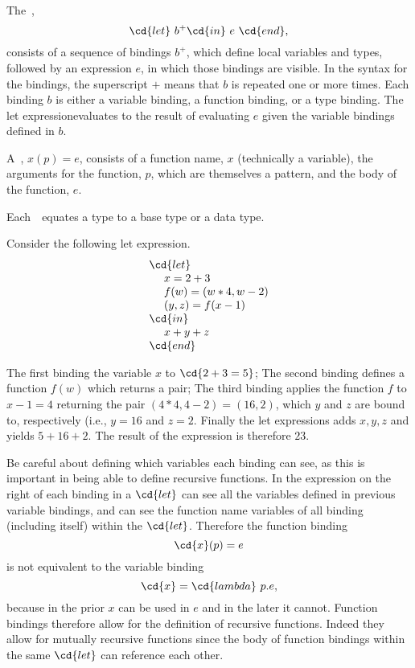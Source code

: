 \begin{gram}[Bindings]

The~, 
\[
\cd{let}~b^+\cd{in}~e~\cd{end},
\] 
%
consists of a sequence of bindings $b^+$, which define local variables
and types, followed by an expression $e$, in which those bindings are
visible.  In the syntax for the bindings, the superscript $+$ means
that $b$ is repeated one or more times.  Each binding $b$ is either a
variable binding, a function binding, or a type binding.
%
The let expressionevaluates to the result of evaluating $e$ given the
variable bindings defined in $b$.

A~, $x (p) = e$, consists of a function
name, $x$ (technically a variable), the arguments for the function,
$p$, which are themselves a pattern, and the body of the function,
$e$. 

%

Each~~equates a type to a base type or a data type.
\end{gram}

\begin{example}
Consider the following let expression.
\[
\begin{array}{l}
\cd{let}\\ 
~~~~x = 2 + 3\\
~~~~f (w) = (w * 4, w - 2)\\
~~~~(y,z) = f(x-1)\\
\cd{in}\\ 
~~~~x + y + z\\
\cd{end} 
\end{array}
\]

The first  binding the variable $x$ to $\cd{2 + 3 = 5}$;
%
The second binding defines a function $f(w)$ which returns a pair;
%
The third binding applies the function $f$ to $x - 1 = 4$
returning the pair $(4 * 4, 4 -2) = (16, 2)$, which
  $y$ and $z$ are bound to, respectively (i.e., $y = 16$ and
  $z = 2$.
%
Finally the let expressions adds $x, y, z$ and yields $5 + 16 + 2$.
The result of the expression is therefore $23$.
\end{example}


\begin{note}
Be careful about defining which variables each binding can see, as
this is important in being able to define recursive functions.  In
\pml{} the expression on the right of each binding in a $\cd{let}$ can
see all the variables defined in previous variable bindings, and can
see the function name variables of all binding (including itself)
within the $\cd{let}$.
%
Therefore the function binding
%
\[
\cd{x}(p) = e
\]
%
is not equivalent to the variable binding
%
\[
\cd{x} = \cd{lambda}~p.e,
\]
%
because in the prior $x$ can be used
in $e$ and in the later it cannot.
%
Function bindings therefore allow for the definition of
recursive functions.  
%
Indeed they allow for mutually recursive functions since the body of
function bindings within the same $\cd{let}$ can reference each other.
\end{note}


